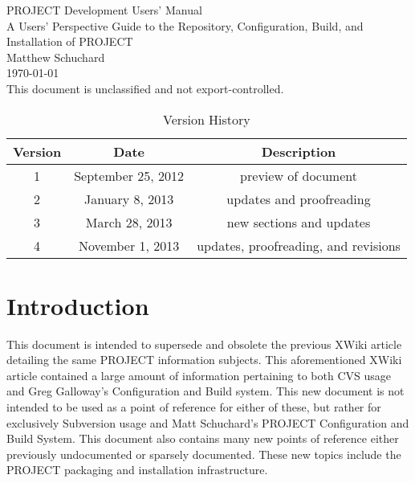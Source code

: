 \documentclass[12pt,letterpaper]{article}
\begin{document}
\begin{titlepage}
\mbox{}
\begin{center}

\Huge PROJECT Development Users' Manual\\
\vspace{1cm}
\Large A Users' Perspective Guide to the Repository, Configuration, Build, and Installation of PROJECT\\
\vspace{3in}
\large Matthew Schuchard\\
\vspace{1in}
\today\\
\vspace{1cm}
This document is unclassified and not export-controlled.

\end{center}
\end{titlepage}

\begin{table}[h]
\centering
\caption{Version History}
\begin{tabular}{| c | c | c |}
Version & Date & Description\\
\hline
1 & September 25, 2012 & preview of document\\
2 & January 8, 2013 & updates and proofreading\\
3 & March 28, 2013 & new sections and updates\\
4 & November 1, 2013 & updates, proofreading, and revisions\\
\end{tabular}
\end{table}
\clearpage

\tableofcontents

\section{Introduction}

This document is intended to supersede and obsolete the previous XWiki article detailing the same PROJECT information subjects.  This aforementioned XWiki article contained a large amount of information pertaining to both CVS usage and Greg Galloway's Configuration and Build system.  This new document is not intended to be used as a point of reference for either of these, but rather for exclusively Subversion usage and Matt Schuchard's PROJECT Configuration and Build System.  This document also contains many new points of reference either previously undocumented or sparsely documented.  These new topics include the PROJECT packaging and installation infrastructure.
\end{document}
